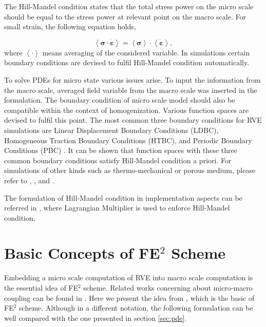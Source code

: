 \documentclass[10pt,a4paper]{scrreprt}
\begin{document}
The Hill-Mandel condition states that the total stress power on the micro scale should be equal to the stress power at relevant point on the macro scale. For small strain, the following equation holds,

\begin{equation}
\left< \bm{\sigma} \cdot \dot{\bm{\varepsilon}} \right> = \left< \bm{\sigma} \right> \cdot \left< \dot{\bm{\varepsilon}} \right>,
\end{equation}
where $\left< \cdot \right>$ means averaging of the considered variable. In simulations certain boundary conditions are devised to fulfil Hill-Mandel condition automatically. 

To solve PDEs for micro state various issues arise. To input the information from the macro scale, averaged field variable from the macro scale was inserted in the formulation. The boundary condition of micro scale model should also be compatible within the context of homogenization. Various function spaces are devised to fulfil this point. The most common three boundary conditions for RVE simulations are Linear Displacement Boundary Conditions (LDBC), Homogeneous Traction Boundary Conditions (HTBC), and Periodic Boundary Conditions (PBC) \citep{gluge2012comparison}. It can be shown that function spaces with these three common boundary conditions satisfy Hill-Mandel condition a priori. For simulations of other kinds such as thermo-mechanical or porous medium, please refer to \citep{mandadapu_homogenization_2012}, \citep{ozdemir_computational_2008}, and \citep{gray_solid_2009}.

The formulation of Hill-Mandel condition in implementation aspects can be referred in \citep{miehe_computational_2002}, where Lagrangian Multiplier is used to enforce Hill-Mandel condition.

%
%

\section{Basic Concepts of FE$^{2}$ Scheme}
Embedding a micro scale computation of RVE into macro scale computation is the essential idea of FE$^{2}$ scheme. Related works concerning about micro-macro coupling can be found in \citep{miehe_computational_1999-1} \citep{miehe_computational_2002} \citep{miehe_computational_2003} \citep{miehe_strain-driven_2002} \citep{miehe_homogenization_2002}. Here we present the idea from \citep{miehe_computational_1999-1}, which is the basic of FE$^{2}$ scheme. Although in a different notation, the following formulation can be well compared with the one presented in section \ref{sec:pde}.
\end{document}
